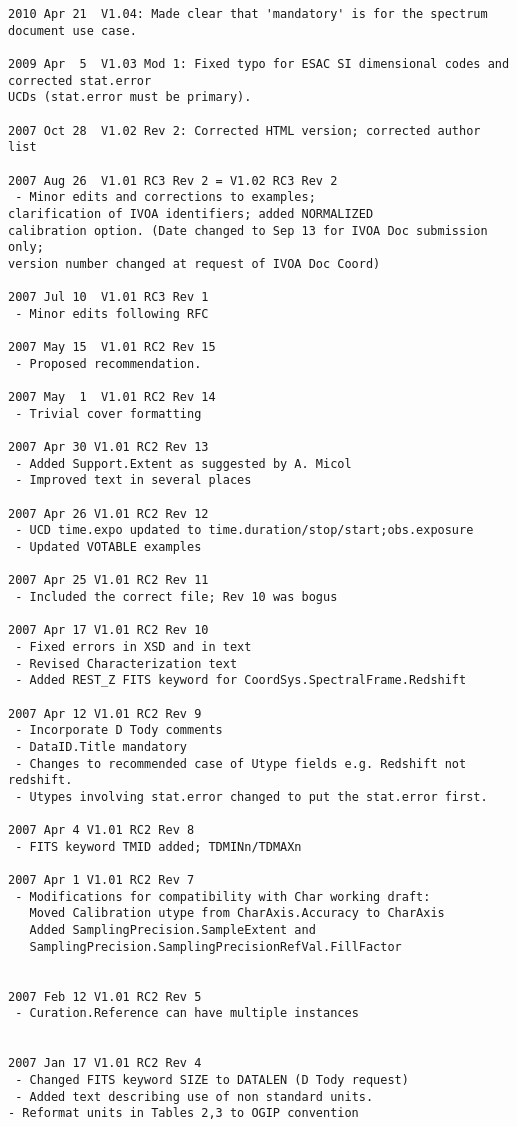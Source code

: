 \documentclass[11pt]{article}
\begin{document}
\begin{verbatim}
2010 Apr 21  V1.04: Made clear that 'mandatory' is for the spectrum document use case.

2009 Apr  5  V1.03 Mod 1: Fixed typo for ESAC SI dimensional codes and corrected stat.error
UCDs (stat.error must be primary).

2007 Oct 28  V1.02 Rev 2: Corrected HTML version; corrected author list

2007 Aug 26  V1.01 RC3 Rev 2 = V1.02 RC3 Rev 2
 - Minor edits and corrections to examples;
clarification of IVOA identifiers; added NORMALIZED
calibration option. (Date changed to Sep 13 for IVOA Doc submission only;
version number changed at request of IVOA Doc Coord)

2007 Jul 10  V1.01 RC3 Rev 1
 - Minor edits following RFC

2007 May 15  V1.01 RC2 Rev 15
 - Proposed recommendation.

2007 May  1  V1.01 RC2 Rev 14
 - Trivial cover formatting

2007 Apr 30 V1.01 RC2 Rev 13
 - Added Support.Extent as suggested by A. Micol
 - Improved text in several places

2007 Apr 26 V1.01 RC2 Rev 12
 - UCD time.expo updated to time.duration/stop/start;obs.exposure
 - Updated VOTABLE examples

2007 Apr 25 V1.01 RC2 Rev 11
 - Included the correct file; Rev 10 was bogus

2007 Apr 17 V1.01 RC2 Rev 10
 - Fixed errors in XSD and in text
 - Revised Characterization text
 - Added REST_Z FITS keyword for CoordSys.SpectralFrame.Redshift

2007 Apr 12 V1.01 RC2 Rev 9
 - Incorporate D Tody comments
 - DataID.Title mandatory
 - Changes to recommended case of Utype fields e.g. Redshift not redshift.
 - Utypes involving stat.error changed to put the stat.error first.

2007 Apr 4 V1.01 RC2 Rev 8
 - FITS keyword TMID added; TDMINn/TDMAXn

2007 Apr 1 V1.01 RC2 Rev 7
 - Modifications for compatibility with Char working draft:
   Moved Calibration utype from CharAxis.Accuracy to CharAxis
   Added SamplingPrecision.SampleExtent and
   SamplingPrecision.SamplingPrecisionRefVal.FillFactor
   
 
2007 Feb 12 V1.01 RC2 Rev 5
 - Curation.Reference can have multiple instances


2007 Jan 17 V1.01 RC2 Rev 4
 - Changed FITS keyword SIZE to DATALEN (D Tody request)
 - Added text describing use of non standard units.
- Reformat units in Tables 2,3 to OGIP convention


\end{verbatim}
\end{document}

